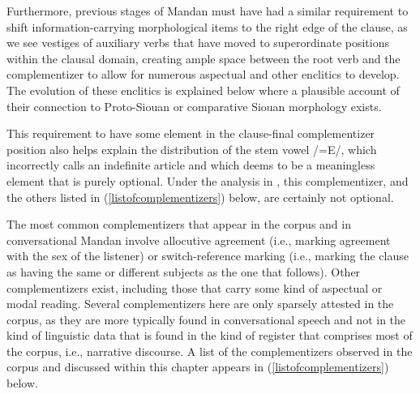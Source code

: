 Furthermore, previous stages of Mandan must have had a similar requirement to shift information-carrying morphological items to the right edge of the clause, as we see vestiges of auxiliary verbs that have moved to superordinate positions within the clausal domain, creating ample space between the root verb and the complementizer to allow for numerous aspectual and other enclitics to develop. The evolution of these enclitics is explained below where a plausible account of their connection to Proto-Siouan or comparative Siouan morphology exists. 

This requirement to have some element in the clause-final complementizer position also helps explain the distribution of the stem vowel /=E/, which \citet[26]{kennard1936} incorrectly calls an indefinite article and which \citet[39]{hollow1970} deems to be a meaningless element that is purely optional. Under the analysis in \citet{kasak2019}, this complementizer, and the others listed in (\ref{listofcomplementizers}) below, are certainly not optional.

The most common complementizers that appear in the corpus and in conversational Mandan involve allocutive agreement (i.e., marking agreement with the sex of the listener) or switch-reference marking (i.e., marking the clause as having the same or different subjects as the one that follows). Other complementizers exist, including those that carry some kind of aspectual or modal reading. Several complementizers here are only sparsely attested in the corpus, as they are more typically found in conversational speech and not in the kind of linguistic data that is found in the kind of register that comprises most of the corpus, i.e., narrative discourse. A list of the complementizers observed in the corpus and discussed within this chapter appears in (\ref{listofcomplementizers}) below.


